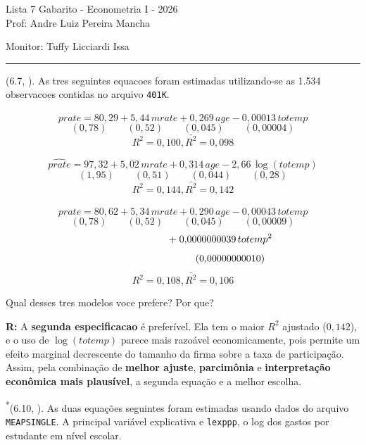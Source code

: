 \documentclass[12pt,letterpaper, onecolumn]{exam}
\renewenvironment{solution}
{\par\noindent\textbf{R:}\enspace\color{blue}}
{\par\color{black}}
\begin{document}
\begingroup
\centering
\LARGE Lista 7 Gabarito - Econometria I - 2026\\[0.5em]
\large Prof: Andre Luiz Pereira Mancha \par
\large Monitor: Tuffy Licciardi Issa \par
\endgroup
\rule{\textwidth}{0.4pt}
\pointsdroppedatright
\printanswers
\renewcommand{\solutiontitle}{\noindent\textbf{Ans:}\enspace}
\newcommand{\qstar}{\hspace{-0.6em}\textsuperscript{*}\hspace{0.2em}}

\begin{questions}

\question (6.7, \citep{wooldridge2016}). As tres seguintes equacoes foram estimadas utilizando-se as 1.534 observacoes contidas no arquivo \texttt{401K}.

\[
\widehat{prate} = 80{,}29 + 5{,}44\,mrate + 0{,}269\,age - 0{,}00013\,totemp
\]
\[
(0{,}78)\qquad (0{,}52)\qquad (0{,}045)\qquad (0{,}00004)
\]
\[
R^2 = 0{,}100, \bar{R^2} = 0,098
\]

\[
\widehat{prate} = 97{,}32 + 5{,}02\,mrate + 0{,}314\,age - 2{,}66\,\log(totemp)
\]
\[
(1{,}95)\qquad (0{,}51)\qquad (0{,}044)\qquad (0{,}28)
\]
\[
R^2 = 0{,}144, \bar{R^2} = 0,142
\]

\[
\widehat{prate} = 80{,}62 + 5{,}34\,mrate + 0{,}290\,age - 0{,}00043\,totemp
\]
\[
(0{,}78)\qquad (0{,}52)\qquad (0{,}045)\qquad (0{,}00009)
\]
\[
\hspace{2.7cm} +\; 0{,}0000000039\,totemp^2
\]
\[
\hspace{2.7cm} \qquad (0{,}00000000010)
\]
\[
R^2 = 0{,}108, \bar{R^2} = 0,106
\]

Qual desses tres modelos voce prefere? Por que?

\begin{solution}
A \textbf{segunda especificacao} é preferível. Ela tem o maior \(R^2\) ajustado (\(0{,}142\)), e o uso de \(\log(totemp)\) parece mais razoável economicamente, pois permite um efeito marginal decrescente do tamanho da firma sobre a taxa de participação.
Assim, pela combinação de \textbf{melhor ajuste}, \textbf{parcimônia} e \textbf{interpretação econômica mais plausível}, a segunda equação e a melhor escolha.
\end{solution}

\vspace{0.7cm}

\question\qstar (6.10, \citep{wooldridge2016}). As duas equações seguintes foram estimadas usando dados do arquivo \texttt{MEAPSINGLE}. A principal variável explicativa e \texttt{lexppp}, o log dos gastos por estudante em nível escolar.


\end{questions}
\end{document}
